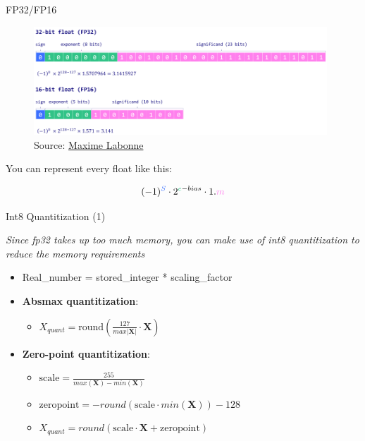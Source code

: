 
\begin{vbframe}{FP32/FP16}

\begin{figure}
	\centering
	\includegraphics[width = 11cm]{./figure/float.png} \\ 
	{\footnotesize Source: \href{https://mlabonne.github.io/blog/posts/Introduction_to_Weight_Quantization.html}{Maxime Labonne}}
\end{figure}

\hspace{}

You can represent every float like this:

$$(-1)^{\textcolor[RGB]{59,112,254}{S}}\cdot 2^{\textcolor[RGB]{49,195,135}{e}-bias} \cdot 1.\textcolor[RGB]{255,128,237}{m}$$
    
\end{vbframe}


\begin{vbframe}{Int8 Quantitization (1)}

\textit{Since fp32 takes up too much memory, you can make use of int8 quantitization to reduce the memory requirements}

\vfill

\begin{itemize}
    \item Real\_number = stored\_integer * scaling\_factor
    \item \textbf{Absmax quantitization}: 
        \begin{itemize}
            \item $X_{quant} = \text{round}\left(\frac{127}{max{|\mathbf{X}|}} \cdot \mathbf{X}\right)$ 
        \end{itemize}
    \item \textbf{Zero-point quantitization}: 
        \begin{itemize}
            \item $\text{scale} = \frac{255}{max(\mathbf{X}) - min(\mathbf{X})}$
            \item $\text{zeropoint} = -round(\text{scale}\cdot min(\mathbf{X})) - 128$
            \item $X_{quant} = round(\text{scale}\cdot \mathbf{X} + \text{zeropoint})$
        \end{itemize}
\end{itemize}

\vfill
    
\end{vbframe}

